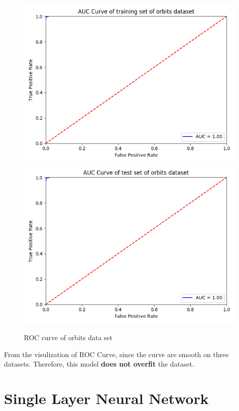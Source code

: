 \documentclass{article}
\begin{document}
\begin{figure}[h]
  \centering
  \includegraphics[scale=0.3]{orbits_auc_train.png}
  \includegraphics[scale=0.3]{orbits_auc_test.png}
  \caption{ROC curve of orbits data set}
\end{figure}

From the visulization of ROC Curve, since the curve are smooth on three datasets. Therefore, this model \textbf{does not overfit} the dataset.  

\pagebreak

\section{Single Layer Neural Network}
\end{document}

